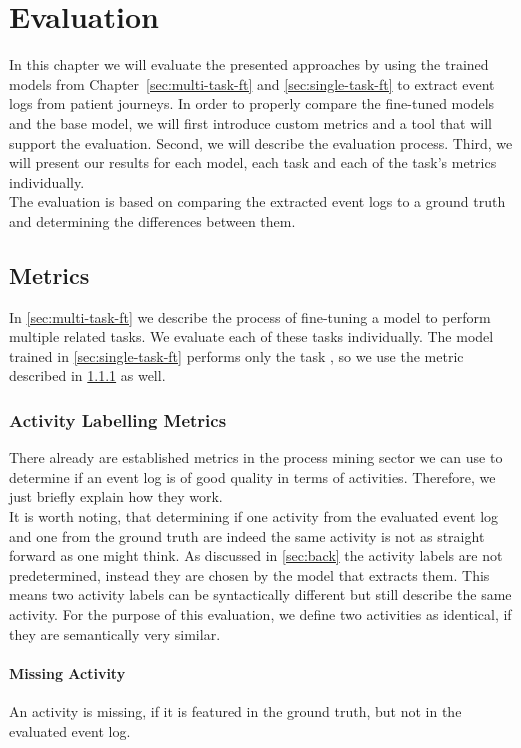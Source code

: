 \section{Evaluation}\label{sec:eval}
In this chapter we will evaluate the presented approaches by using the trained models from Chapter~\ref{sec:multi-task-ft} and \ref{sec:single-task-ft} to extract event logs from patient journeys. In order to properly compare the fine-tuned models and the base model, we will first introduce custom metrics and a tool that will support the evaluation. Second, we will describe the evaluation process. Third, we will present our results for each model, each task and each of the task's metrics individually.\\
The evaluation is based on comparing the extracted event logs to a ground truth and determining the differences between them.

\subsection{Metrics}\label{sec:metrics}
In \ref{sec:multi-task-ft} we describe the process of fine-tuning a model to perform multiple related tasks. We evaluate each of these tasks individually. The model trained in \ref{sec:single-task-ft} performs only the task , so we use the metric described in \ref{sec:activity_metrics} as well.

\subsubsection{Activity Labelling Metrics}\label{sec:activity_metrics}
There already are established metrics in the process mining sector we can use to determine if an event log is of good quality in terms of activities. Therefore, we just briefly explain how they work.\\
It is worth noting, that determining if one activity from the evaluated event log and one from the ground truth are indeed the same activity is not as straight forward as one might think. As discussed in \ref{sec:back} the activity labels are not predetermined, instead they are chosen by the model that extracts them. This means two activity labels can be syntactically different but still describe the same activity. For the purpose of this evaluation, we define two activities as identical, if they are semantically very similar.
\paragraph{Missing Activity} An activity is missing, if it is featured in the ground truth, but not in the evaluated event log. 
